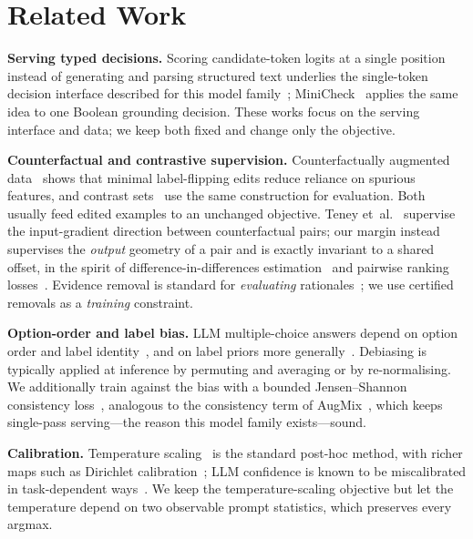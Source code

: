\documentclass[conference]{IEEEtran}
\begin{document}
\section{Related Work}
\label{sec:related}

\textbf{Serving typed decisions.} Scoring candidate-token logits at a single
position instead of generating and parsing structured text underlies the
single-token decision interface described for this model
family~\cite{rogge2026,nimble2026}; MiniCheck~\cite{tang2024minicheck} applies
the same idea to one Boolean grounding decision. These works focus on the
serving interface and data; we keep both fixed and change only the objective.

\textbf{Counterfactual and contrastive supervision.} Counterfactually augmented
data~\cite{kaushik2020counterfactual} shows that minimal label-flipping edits
reduce reliance on spurious features, and contrast sets~\cite{gardner2020contrast}
use the same construction for evaluation. Both usually feed edited examples to
an unchanged objective. Teney et~al.~\cite{teney2020counterfactual} supervise
the input-gradient direction between counterfactual pairs; our margin instead
supervises the \emph{output} geometry of a pair and is exactly invariant to a
shared offset, in the spirit of difference-in-differences
estimation~\cite{angrist2009mostly} and pairwise ranking
losses~\cite{burges2005ranknet}. Evidence removal is standard for
\emph{evaluating} rationales~\cite{deyoung2020eraser}; we use certified
removals as a \emph{training} constraint.

\textbf{Option-order and label bias.} LLM multiple-choice answers depend on
option order and label identity~\cite{zheng2024selectors,pezeshkpour2024order,robinson2023mcsb},
and on label priors more generally~\cite{zhao2021calibrate}. Debiasing is
typically applied at inference by permuting and averaging or by
re-normalising. We additionally train against the bias with a bounded
Jensen--Shannon consistency loss~\cite{lin1991divergence}, analogous to the
consistency term of AugMix~\cite{hendrycks2020augmix}, which keeps single-pass
serving---the reason this model family exists---sound.

\textbf{Calibration.} Temperature scaling~\cite{guo2017calibration} is the
standard post-hoc method, with richer maps such as Dirichlet
calibration~\cite{kull2019dirichlet}; LLM confidence is known to be
miscalibrated in task-dependent ways~\cite{jiang2021know,kadavath2022know}. We
keep the temperature-scaling objective but let the temperature depend on two
observable prompt statistics, which preserves every argmax.
\end{document}
